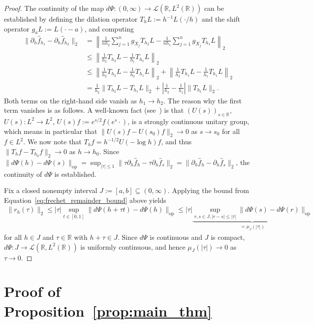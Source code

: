 \begin{proof}
    The continuity of the map $d\Psi:(0,\infty)\to\mathcal{L}(\mathbb{R},L^2(\mathbb{R}))$ can be established by defining the dilation operator $T_hL:=h^{-1}L(\cdot/h)$ and the shift operator $g_aL:=L(\cdot-a)$, and computing
    \begin{align*}
        \|\partial_h\hat{f}_{h_1}-\partial_h\hat{f}_{h_2}\|_2&=\left\|\frac{1}{nh_2}\sum_{j=1}^{n}g_{X_j}T_{h_2}L-\frac{1}{nh_1}\sum_{j=1}^{n}g_{X_j}T_{h_1}L\right\|_2\\&
        \le\left\|\frac{1}{h_2}T_{h_2}L-\frac{1}{h_1}T_{h_1}L\right\|_2\\&
        \le\left\|\frac{1}{h_2}T_{h_2}L-\frac{1}{h_2}T_{h_1}L\right\|_2+\left\|\frac{1}{h_2}T_{h_1}L-\frac{1}{h_1}T_{h_1}L\right\|_2\\&
        =\frac{1}{h_2}\|T_{h_2}L-T_{h_1}L\|_2+\left|\frac{1}{h_2}-\frac{1}{h_1}\right|\|T_{h_1}L\|_2.
    \end{align*}
    Both terms on the right-hand side vanish as $h_1\to h_2$. The reason why the first term vanishes is as follows. A well-known fact (see~\cite[Example~5.4.8]{de2009intermediate}) is that $(U(s))_{s\in\mathbb{R}}$, $U(s):L^2\to L^2$, $U(s)f:=e^{s/2}f(e^s\cdot)$, is a strongly continuous unitary group, which means in particular that $\|U(s)f-U(s_0)f\|_2\to0$ as $s\to s_0$ for all $f\in L^2$. We now note that $T_hf=h^{-1/2}U(-\log{h})f$, and thus $\|T_hf-T_{h_0}f\|_2\to0$ as $h\to h_0$. Since $\|d\Psi(h)-d\Psi(s)\|_{\operatorname{op}}=\sup_{|\tau|\le 1}\|\tau\partial_h\hat{f}_h-\tau\partial_h\hat{f}_s\|_2=\|\partial_h\hat{f}_h-\partial_h\hat{f}_s\|_2$, the continuity of $d\Psi$ is established.

    Fix a closed nonempty interval $J:=[a,b]\subseteq(0,\infty)$. Applying the bound from Equation~\eqref{eq:frechet_remainder_bound} above yields
    \begin{align*}
        \|r_h(\tau)\|_2\le|\tau|\sup_{t\in[0,1]}\|d\Psi(h+\tau t)-d\Psi(h)\|_{\operatorname{op}}\le|\tau|\underbrace{\sup_{r,s\in J,|r-s|\le|\tau|}\|d\Psi(s)-d\Psi(r)\|_{\operatorname{op}}}_{=\mu_J(|\tau|)}
    \end{align*}
    for all $h\in J$ and $\tau\in\mathbb{R}$ with $h+\tau\in J$. Since $d\Psi$ is continuous and $J$ is compact, $d\Psi:J\to\mathcal{L}(\mathbb{R},L^2(\mathbb{R}))$ is uniformly continuous, and hence $\mu_{J}(|\tau|)\to0$ as $\tau\to0$.
\end{proof}

\section{Proof of Proposition~\ref{prop:main_thm}}\label{sec:proof_main_thm}

